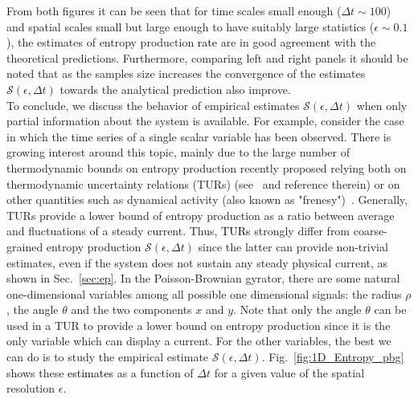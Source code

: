 \documentclass[12pt]{iopart}
\newcommand{\eps} {\epsilon}
\newcommand{\cS} {\mathcal{S}}
\begin{document}
From both figures it can be seen that for time scales small enough ($\Delta t \sim 100$) and spatial scales small but large enough to have suitably large statistics ($\eps\sim 0.1$), the estimates of entropy production \textcolor{black}{rate} are in good agreement with the theoretical predictions. Furthermore, comparing left and right panels it should be noted that as the samples size increases the convergence of the estimates $\cS(\eps,\Delta t)$ towards the analytical prediction also improve. \\
To conclude, we discuss the behavior of empirical estimates $\cS(\eps,\Delta t)$ when only partial information about the system is available. For example, consider the case in which the time series of a single scalar variable has been observed. %
There is growing interest around this topic, mainly due to the large number of thermodynamic bounds on entropy production recently proposed relying both on thermodynamic uncertainty relations (TURs) (see~\cite{barato2015thermodynamic,seifert2018stochastic,plati2023thermodynamic,di2023variance} and reference therein) or on other quantities such as dynamical activity (also known as "frenesy")~\cite{maes17,terlizzi18}.
Generally, TURs provide a lower bound of entropy production as a ratio between average and fluctuations of a steady current. Thus, \textcolor{black}{TURs} strongly differ from coarse-grained entropy production  $\cS(\eps,\Delta t)$ since the latter can provide non-trivial estimates, even if the system does not sustain any steady physical current, as shown in Sec.~\ref{sec:ep}. In the Poisson-Brownian gyrator, there are some natural one-dimensional variables among all possible one dimensional signals: the radius $\rho$, the angle $\theta$ and the two components $x$ and $y$. Note that only the angle $\theta$ can be used in a TUR to provide a lower bound on entropy production since it is the only variable which can display a current. For the other variables, the best we can do is to study the empirical estimate $\cS(\eps,\Delta t)$. Fig.~\ref{fig:1D_Entropy_pbg} shows these \textcolor{black}{estimates} as a function of $\Delta t$ for a given value of the spatial resolution $\epsilon$. 
\end{document}
